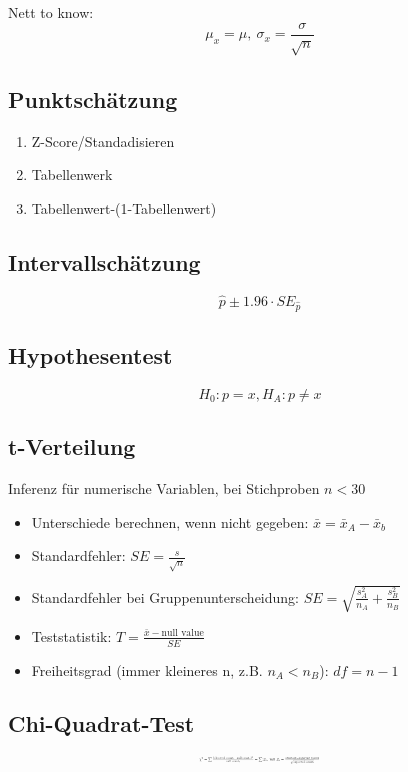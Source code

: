 \documentclass[10pt,a4paper,landscape]{article}
\begin{document}
\begin{multicols}{4}
Nett to know:
\[
\mu_x = \mu, ~ \sigma_x = \frac{\sigma}{\sqrt{n}}
\]

\subsection{Punktschätzung}
\begin{enumerate}
\item Z-Score/Standadisieren
\item Tabellenwerk
\item Tabellenwert-(1-Tabellenwert)
\end{enumerate}

\subsection{Intervallschätzung}
\[
\hat{p} \pm 1.96 \cdot SE_{\hat{p}}
\]

\subsection{Hypothesentest}
\[
H_0 : p = x, H_A: p \neq x
\]

\subsection{t-Verteilung}
Inferenz für numerische Variablen, bei Stichproben $n < 30$

\begin{itemize}
\item Unterschiede berechnen, wenn nicht gegeben: $\bar{x} = \bar{x}_A - \bar{x}_b$
\item Standardfehler: $SE = \frac{s}{\sqrt{n}}$
\item Standardfehler bei Gruppenunterscheidung: $SE = \sqrt{\frac{s_A^2}{n_A} + \frac{s_B^2}{n_B}}$
\item Teststatistik: $T = \frac{\bar{x} - \text{null value}}{SE}$
\item Freiheitsgrad (immer kleineres n, z.B. $n_A < n_B$): $df = n - 1$
\end{itemize}

\subsection{Chi-Quadrat-Test}
\[\resizebox{0.25\textwidth}{!}{$
\chi^2 = \sum \frac{(\text{observed count}_i-\text{null count}_i)^2}{\text{null count}_i} = \sum Z_i, ~\text{mit } Z_i = \frac{\text{observed} - \text{expected counts}}{\sqrt{\text{expected counts}}}
$}
\]

\end{multicols}
\end{document}
